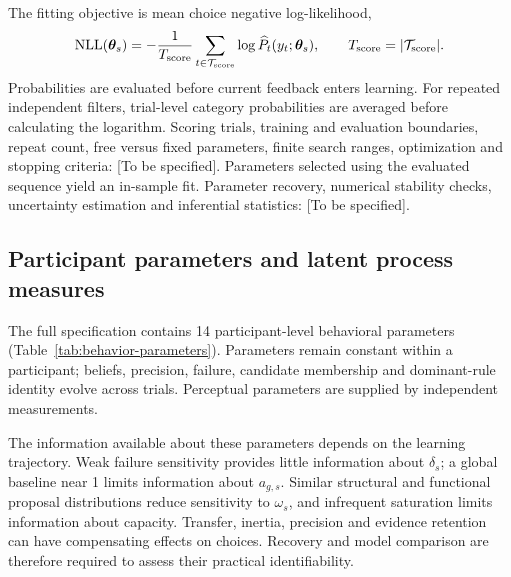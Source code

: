 The fitting objective is mean choice negative log-likelihood,
\begin{equation}
\mathrm{NLL}(\bm\theta_s)=
-\frac1{T_{\rm score}}\sum_{t\in\mathcal T_{\rm score}}
\log\widehat P_t(y_t;\bm\theta_s),
\qquad T_{\rm score}=|\mathcal T_{\rm score}|.
\label{eq:choice-nll}
\end{equation}
Probabilities are evaluated before current feedback enters learning. For repeated independent filters, trial-level category probabilities are averaged before calculating the logarithm. Scoring trials, training and evaluation boundaries, repeat count, free versus fixed parameters, finite search ranges, optimization and stopping criteria: [To be specified]. Parameters selected using the evaluated sequence yield an in-sample fit. Parameter recovery, numerical stability checks, uncertainty estimation and inferential statistics: [To be specified].

\subsection*{Participant parameters and latent process measures}
\label{m:measures}

The full specification contains 14 participant-level behavioral parameters (Table~\ref{tab:behavior-parameters}). Parameters remain constant within a participant; beliefs, precision, failure, candidate membership and dominant-rule identity evolve across trials. Perceptual parameters are supplied by independent measurements.

The information available about these parameters depends on the learning trajectory. Weak failure sensitivity provides little information about $\delta_s$; a global baseline near 1 limits information about $a_{g,s}$. Similar structural and functional proposal distributions reduce sensitivity to $\omega_s$, and infrequent saturation limits information about capacity. Transfer, inertia, precision and evidence retention can have compensating effects on choices. Recovery and model comparison are therefore required to assess their practical identifiability.

